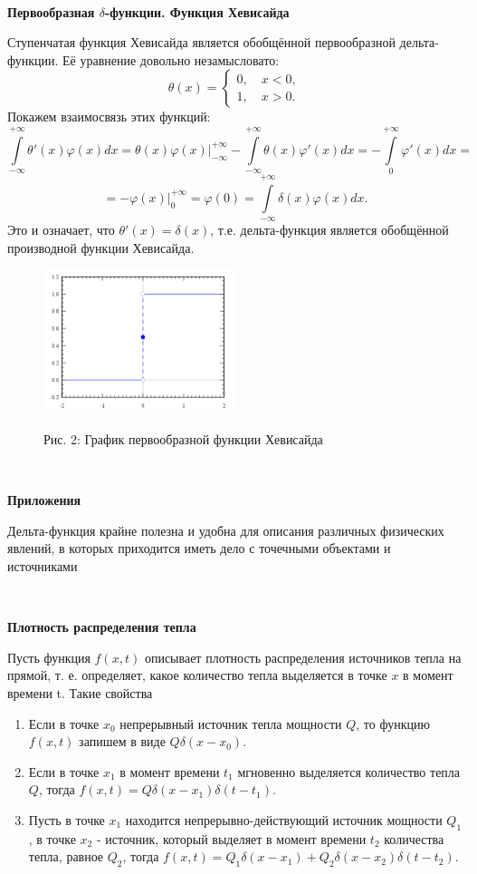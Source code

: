 \documentclass[russian,12pt]{article}
\providecommand{\header}[1]{
    \,
    \begin{center}
        {\Large \textbf{#1}}
    \end{center}
    }
\providecommand{\subheader}[1]{
    \,
    \begin{center}
        {\large \textbf{#1}}
    \end{center}
    }
\begin{document}
\subheader{Первообразная $\delta$-функции. Функция Хевисайда}
Ступенчатая функция Хевисайда является обобщённой первообразной дельта-функции. Её уравнение довольно незамысловато:
$$\theta(x) = \begin{cases}
    0, \quad x < 0, \\
    1, \quad x > 0.
\end{cases}$$
Покажем взаимосвязь этих функций:
$$\int\limits_{-\infty}^{+\infty}\theta'(x)\varphi(x)dx = \theta(x)\varphi(x)|^{+\infty}_{-\infty} - \int\limits_{-\infty}^{+\infty}\theta(x)\varphi'(x)dx = - \int\limits_{0}^{+\infty}\varphi'(x)dx = $$
$$= -\varphi(x)|^{+\infty}_{0} = \varphi(0) = \int\limits_{-\infty}^{+\infty}\delta(x)\varphi(x)dx.$$
Это и означает, что $\theta'(x) = \delta(x)$, т.е. дельта-функция является обобщённой производной функции Хевисайда.
\begin{figure}[!h]
    \centering
    \includegraphics[width=0.5\textwidth]{heavyside}
    \begin{center}{\footnotesize Рис. 2: График первообразной функции Хевисайда}\end{center}
\end{figure}

\header{Приложения}
Дельта-функция крайне полезна и удобна для описания различных физических явлений, в которых приходится иметь дело с точечными объектами и источниками
\subheader{Плотность распределения тепла}
Пусть функция $f(x, t)$ описывает плотность распределения источников тепла на прямой, т. е. определяет, какое количество тепла выделяется в точке $x$ в момент времени t. Такие свойства
\begin{enumerate}
    \item Если в точке $x_0$ непрерывный источник тепла мощности $Q$, то функцию $f(x, t)$ запишем в виде $Q\delta(x-x_0)$.
    \item Если в точке $x_1$ в момент времени $t_1$ мгновенно выделяется количество тепла $Q$, тогда $f(x, t)=Q\delta(x-x_1)\delta(t-t_1)$.
    \item Пусть в точке $x_1$ находится непрерывно-действующий источник мощности $Q_1$, в точке $x_2$ - источник, который выделяет в момент времени $t_2$ количества тепла, равное $Q_2$, тогда $f(x, t)=Q_1\delta(x-x_1)+Q_2\delta(x-x_2)\delta(t-t_2)$.
\end{enumerate}
\end{document}
